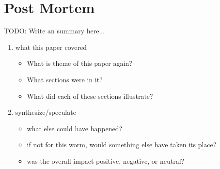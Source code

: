 \section*{Post Mortem}
TODO: Write an summary here... 

\begin{enumerate}
\item what this paper covered
	\begin{itemize}
	\item What is theme of this paper again?
	\item What sections were in it?
	\item What did each of these sections illustrate?
	\end{itemize}
\item synthesize/speculate
	\begin{itemize}
  	\item what else could have happened?
    \item if not for this worm, would something else have taken its place?
    \item was the overall impact positive, negative, or neutral?
  	\end{itemize} 
\end{enumerate}